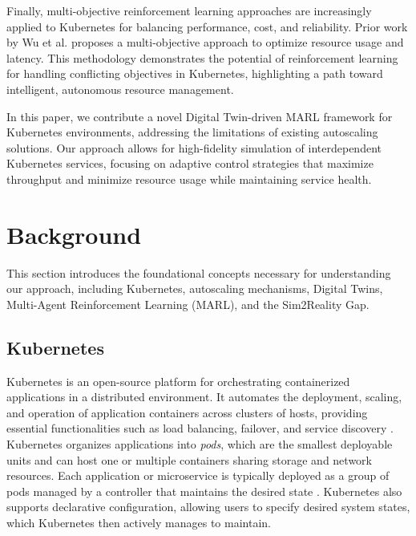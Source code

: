 \documentclass[conference]{IEEEtran}
\begin{document}
Finally, multi-objective reinforcement learning approaches are increasingly applied to Kubernetes for balancing performance, cost, and reliability. Prior work by Wu et al. \cite{wu_multi_objective_rl} proposes a multi-objective approach to optimize resource usage and latency. This methodology demonstrates the potential of reinforcement learning for handling conflicting objectives in Kubernetes, highlighting a path toward intelligent, autonomous resource management.

In this paper, we contribute a novel Digital Twin-driven MARL framework for Kubernetes environments, addressing the limitations of existing autoscaling solutions. Our approach allows for high-fidelity simulation of interdependent Kubernetes services, focusing on adaptive control strategies that maximize throughput and minimize resource usage while maintaining service health.


\section{Background}
\label{sec:background}
This section introduces the foundational concepts necessary for understanding our approach, including Kubernetes, autoscaling mechanisms, Digital Twins, Multi-Agent Reinforcement Learning (MARL), and the Sim2Reality Gap.

\subsection{Kubernetes}
Kubernetes is an open-source platform for orchestrating containerized applications in a distributed environment. It automates the deployment, scaling, and operation of application containers across clusters of hosts, providing essential functionalities such as load balancing, failover, and service discovery \cite{hpa_design}. Kubernetes organizes applications into \textit{pods}, which are the smallest deployable units and can host one or multiple containers sharing storage and network resources. Each application or microservice is typically deployed as a group of pods managed by a controller that maintains the desired state \cite{rosenberg_k8s_autoscaling}. Kubernetes also supports declarative configuration, allowing users to specify desired system states, which Kubernetes then actively manages to maintain.
\end{document}
